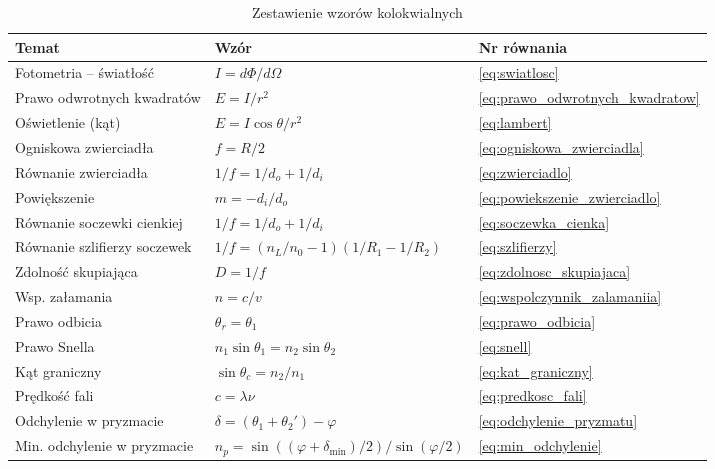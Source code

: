 \documentclass[12pt,a4paper]{article}
\begin{document}
\begin{table}[H]
\centering
\renewcommand{\arraystretch}{1.6}
\begin{tabular}{lll}
\toprule
\textbf{Temat} & \textbf{Wzór} & \textbf{Nr równania} \\
\midrule
Fotometria -- światłość     & $I = d\Phi/d\Omega$ & \eqref{eq:swiatlosc} \\
Prawo odwrotnych kwadratów  & $E = I/r^2$         & \eqref{eq:prawo_odwrotnych_kwadratow} \\
Oświetlenie (kąt)           & $E = I\cos\theta/r^2$ & \eqref{eq:lambert} \\
Ogniskowa zwierciadła       & $f = R/2$           & \eqref{eq:ogniskowa_zwierciadla} \\
Równanie zwierciadła        & $1/f = 1/d_o + 1/d_i$ & \eqref{eq:zwierciadlo} \\
Powiększenie                & $m = -d_i/d_o$      & \eqref{eq:powiekszenie_zwierciadlo} \\
Równanie soczewki cienkiej  & $1/f = 1/d_o + 1/d_i$ & \eqref{eq:soczewka_cienka} \\
Równanie szlifierzy soczewek & $1/f=(n_L/n_0-1)(1/R_1-1/R_2)$ & \eqref{eq:szlifierzy} \\
Zdolność skupiająca         & $D = 1/f$           & \eqref{eq:zdolnosc_skupiajaca} \\
Wsp. załamania              & $n = c/v$           & \eqref{eq:wspolczynnik_zalamaniia} \\
Prawo odbicia               & $\theta_r = \theta_1$ & \eqref{eq:prawo_odbicia} \\
Prawo Snella                & $n_1\sin\theta_1 = n_2\sin\theta_2$ & \eqref{eq:snell} \\
Kąt graniczny               & $\sin\theta_c = n_2/n_1$ & \eqref{eq:kat_graniczny} \\
Prędkość fali               & $c = \lambda\nu$    & \eqref{eq:predkosc_fali} \\
Odchylenie w pryzmacie      & $\delta = (\theta_1+\theta_2')-\varphi$ & \eqref{eq:odchylenie_pryzmatu} \\
Min. odchylenie w pryzmacie & $n_p = \sin((\varphi+\delta_{\min})/2)/\sin(\varphi/2)$ & \eqref{eq:min_odchylenie} \\
\bottomrule
\end{tabular}
\caption{Zestawienie wzorów kolokwialnych}
\end{table}
\end{document}
